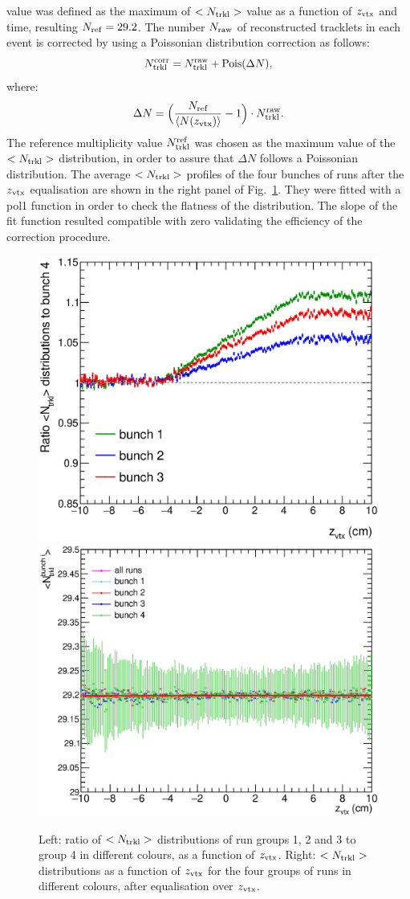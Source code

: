 value was defined as the maximum of $<N_{\rm trkl}>$ value as a function of $z_{\rm vtx}$ and time,
resulting $N_{\rm ref} =  29.2$. 
The number $N_{\rm raw}$ of reconstructed tracklets in each event
is corrected by using a Poissonian distribution correction as follows:
\begin{equation} 
\label{eq:NtrklCorr}
N_{\rm trkl}^{\rm corr} = N_{\rm trkl}^{\rm raw} + {\rm Pois}(\Delta N),
\end{equation}
where:
\begin{equation} 
\label{eq:NtrklCorr}
\Delta N = \Big (\frac{N_{\rm ref}}{\langle N(z_{\rm vtx}) \rangle} -1 \Big ) \cdot N_{\rm trkl}^{\rm raw}.
\end{equation}
 The reference multiplicity value $N_{\rm trkl}^{\rm ref}$ was chosen as the
 maximum value of the $<N_{\rm trkl}>$ distribution, in order to assure
 that $\Delta N$ follows a Poissonian distribution. 
The average $<N_{\rm trkl}>$ profiles of the four bunches of runs 
after the $z_{\rm vtx}$ equalisation are shown in the right panel of 
Fig.~\ref{fig:FourBunches}. They were fitted with a pol1 function in order
to check the flatness of the distribution. The slope of the fit function resulted compatible with zero
validating the efficiency of the correction procedure.

\begin{figure}[h]
\centering
 \includegraphics[width=.49\textwidth]{FigCap6/UncorrNtrklProfileDataRatio.eps}
 \includegraphics[width=.49\textwidth]{FigCap6/NtrkProfilesDataAfterZVxtEqual.eps}
 \caption{Left: ratio of $<N_{\rm trkl}>$ distributions of run groups 1, 2 and 3 to group 4 in different colours, as a function of $z_{\rm vtx}$. Right: $<N_{\rm trkl}>$ distributions as a function of $z_{\rm vtx}$ for the four groups of runs in different colours, after equalisation over $z_{\rm vtx}$.}
 \label{fig:FourBunches}
\end{figure}


